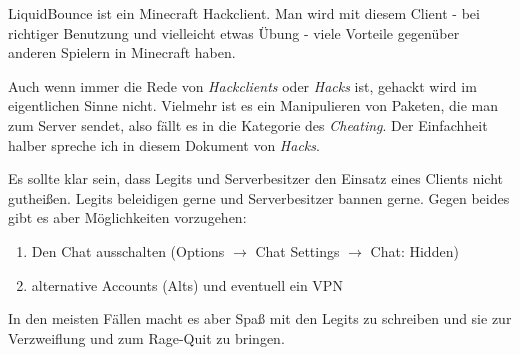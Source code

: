 LiquidBounce ist ein Minecraft Hackclient. Man wird mit diesem Client - bei richtiger Benutzung und vielleicht etwas Übung - viele Vorteile gegenüber anderen Spielern in Minecraft haben.

Auch wenn immer die Rede von \textit{Hackclients} oder \textit{Hacks} ist, gehackt wird im eigentlichen Sinne nicht. Vielmehr ist es ein Manipulieren von Paketen, die man zum Server sendet, also fällt es in die Kategorie des \textit{Cheating}. Der Einfachheit halber spreche ich in diesem Dokument von \textit{Hacks}.

Es sollte klar sein, dass Legits und Serverbesitzer den Einsatz eines Clients nicht gutheißen. Legits beleidigen gerne und Serverbesitzer bannen gerne. Gegen beides gibt es aber Möglichkeiten vorzugehen:
\begin{enumerate}[label=(\alph*)]
    \item Den Chat ausschalten (Options $\to$ Chat Settings $\to$ Chat: Hidden)
    \item alternative Accounts (Alts) und eventuell ein VPN
\end{enumerate}
In den meisten Fällen macht es aber Spaß mit den Legits zu schreiben und sie zur Verzweiflung und zum Rage-Quit zu bringen.